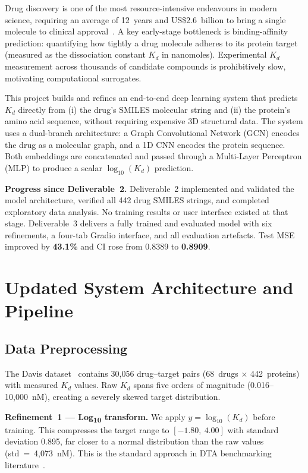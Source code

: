 \documentclass[conference]{IEEEtran}
\begin{document}
Drug discovery is one of the most resource-intensive endeavours in modern
science, requiring an average of 12~years and US\$2.6~billion to bring a
single molecule to clinical approval~\cite{dimasi2016}. A key early-stage
bottleneck is binding-affinity prediction: quantifying how tightly a drug
molecule adheres to its protein target (measured as the dissociation constant
$K_d$ in nanomoles). Experimental $K_d$ measurement across thousands of
candidate compounds is prohibitively slow, motivating computational surrogates.

This project builds and refines an end-to-end deep learning system that
predicts $K_d$ directly from (i) the drug's SMILES molecular string and
(ii) the protein's amino acid sequence, without requiring expensive 3D
structural data. The system uses a dual-branch architecture: a Graph
Convolutional Network (GCN) encodes the drug as a molecular graph, and a
1D CNN encodes the protein sequence. Both embeddings are concatenated and
passed through a Multi-Layer Perceptron (MLP) to produce a scalar
$\log_{10}(K_d)$ prediction.

\textbf{Progress since Deliverable~2.}
Deliverable~2 implemented and validated the model architecture, verified all
442 drug SMILES strings, and completed exploratory data analysis. No training
results or user interface existed at that stage. Deliverable~3 delivers a
fully trained and evaluated model with six refinements, a four-tab Gradio
interface, and all evaluation artefacts. Test MSE improved by \textbf{43.1\%}
and CI rose from 0.8389 to \textbf{0.8909}.

\section{Updated System Architecture and Pipeline}

\subsection{Data Preprocessing}

The Davis dataset~\cite{davis2011} contains 30,056 drug--target pairs
(68~drugs $\times$ 442~proteins) with measured $K_d$ values. Raw $K_d$ spans
five orders of magnitude (0.016--10,000~nM), creating a severely skewed target
distribution.

\textbf{Refinement~1 --- Log\textsubscript{10} transform.}
We apply $y = \log_{10}(K_d)$ before training. This compresses the target
range to $[-1.80,\ 4.00]$ with standard deviation 0.895, far closer to a
normal distribution than the raw values (std~=~4,073~nM). This is the
standard approach in DTA benchmarking literature~\cite{ozturk2018}.
\end{document}
